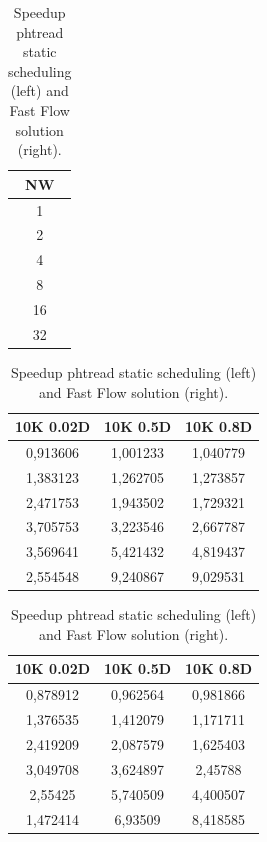 \begin{table}[!htb]
    \centering
    \begin{minipage}{0.08\textwidth}
    \centering
    \begin{tabular}{|c|}
    \hline
    NW \\ \hline
    1          \\ \hline
    2      \\ \hline
    4           \\ \hline
    8            \\ \hline
    16       \\ \hline
    32          \\ \hline
    \end{tabular}
    \end{minipage}
    \begin{minipage}{0.43\textwidth}
    \centering
    \begin{tabular}{|c|c|c|}
    \hline
    10K 0.02D & 10K 0.5D & 10K 0.8D \\ \hline
    0,913606  & 1,001233 & 1,040779 \\ \hline
    1,383123  & 1,262705 & 1,273857 \\ \hline
    2,471753  & 1,943502 & 1,729321 \\ \hline
    3,705753  & 3,223546 & 2,667787 \\ \hline
    3,569641  & 5,421432 & 4,819437 \\ \hline
    2,554548  & 9,240867 & 9,029531 \\ \hline
    \end{tabular}
    \end{minipage}
    \begin{minipage}{0.43\textwidth}
    \centering
    \begin{tabular}{|c|c|c|}
    \hline
    10K 0.02D & 10K 0.5D & 10K 0.8D \\ \hline
    0,878912  & 0,962564 & 0,981866 \\ \hline
    1,376535  & 1,412079 & 1,171711 \\ \hline
    2,419209  & 2,087579 & 1,625403 \\ \hline
    3,049708  & 3,624897 & 2,45788  \\ \hline
    2,55425   & 5,740509 & 4,400507 \\ \hline
    1,472414  & 6,93509  & 8,418585 \\ \hline
    \end{tabular}
    \end{minipage}
    \caption{Speedup phtread static scheduling (left) and Fast Flow solution (right).}
    \label{table:spup_static}
    \end{table}
\FloatBarrier

